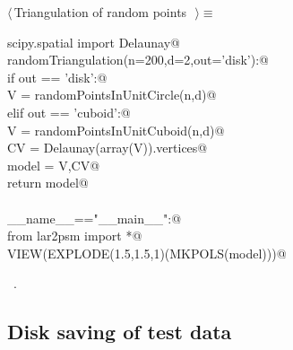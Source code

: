 \documentclass[11pt,oneside]{article}	%
\begin{document}
\begin{flushleft} \small \label{scrap25}
$\langle\,$Triangulation of random points\nobreak\ {\footnotesize {}}$\,\rangle\equiv$
\vspace{-1ex}
\begin{list}{}{} \item
\mbox{}\verb@from scipy.spatial import Delaunay@\\
\mbox{}\verb@def randomTriangulation(n=200,d=2,out='disk'):@\\
\mbox{}\verb@   if out == 'disk':@\\
\mbox{}\verb@      V = randomPointsInUnitCircle(n,d)@\\
\mbox{}\verb@   elif out == 'cuboid':@\\
\mbox{}\verb@      V = randomPointsInUnitCuboid(n,d)@\\
\mbox{}\verb@   CV = Delaunay(array(V)).vertices@\\
\mbox{}\verb@   model = V,CV@\\
\mbox{}\verb@   return model@\\
\mbox{}\verb@@\\
\mbox{}\verb@if __name__=="__main__":@\\
\mbox{}\verb@   from lar2psm import *@\\
\mbox{}\verb@   VIEW(EXPLODE(1.5,1.5,1)(MKPOLS(model)))@\\
\mbox{}\verb@@{\NWsep}
\end{list}
\vspace{-1ex}
\footnotesize\addtolength{\baselineskip}{-1ex}
\begin{list}{}{\setlength{\itemsep}{-\parsep}\setlength{\itemindent}{-\leftmargin}}
\item \NWtxtMacroRefIn\ .
\end{list}
\end{flushleft}

\subsection{Disk saving of test data}
\end{document}
